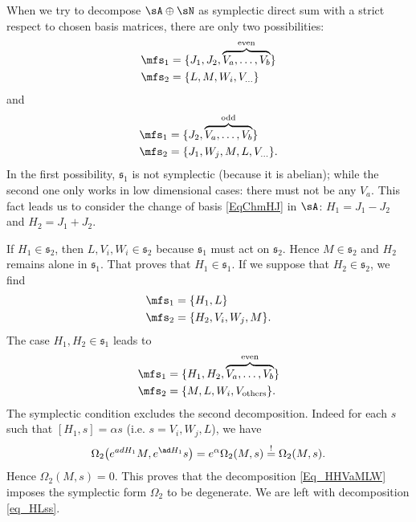 When we try to decompose $\sA\oplus\sN$ as symplectic direct sum with a strict respect to chosen basis matrices, there are only two possibilities:
\begin{equation}
	\begin{split}
		\mfs_1&=\{ J_1,J_2,\overbrace{V_a,\ldots,V_b}^{\text{even}}  \}\\
		\mfs_2&=\{ L,M,W_i,V_{\ldots}  \}
	\end{split}
\end{equation}
and
\begin{equation}
	\begin{split}
		\mfs_1&=\{ J_2,\overbrace{V_a,\ldots,V_b}^{\text{odd}}  \}\\
		\mfs_2&=\{ J_1,W_j,M,L,V_{\ldots}  \}  .
	\end{split}
\end{equation}
In the first possibility, $\mathfrak{s}_{1}$ is not symplectic (because it is abelian); while the second one only works in low dimensional cases: there must not be any $V_a$. This fact leads us to consider  the change of basis \eqref{EqChmHJ} in $\sA$: $H_1=J_1-J_2$ and $H_2=J_1+J_2$.

If $H_1\in\mathfrak{s}_2$, then $L,V_i,W_i\in\mathfrak{s}_2$ because $\mathfrak{s}_1$ must act on $\mathfrak{s}_2$. Hence $M\in\mathfrak{s}_2$ and $H_2$ remains alone in $\mathfrak{s}_1$. That proves that $H_1\in\mathfrak{s}_1$. If we suppose that $H_2\in\mathfrak{s}_2$, we find
\begin{equation}  \label{eq_HLss}
	\begin{split}
		\mfs_1&=\{ H_1,L  \}\\
		\mfs_2&=\{ H_2,V_i,W_j,M  \}.
	\end{split}
\end{equation}
The case $H_1,H_2\in\mathfrak{s}_1$ leads to
\begin{equation}   \label{Eq_HHVaMLW}
	\begin{split}
		\mfs_1&=\{ H_1,H_2,\overbrace{V_a,\ldots, V_b}^{\text{even}}  \}\\
		\mfs_2&=\{ M,L,W_i,V_{\text{others}}  \}.
	\end{split}
\end{equation}
The symplectic condition excludes the second decomposition. Indeed for each $s$ such that $[H_1,s]=\alpha s$ (i.e. $s=V_i,W_j,L$), we have
\[
	\Omega_2\big(  e^{ad H_1}M, e^{\ad H_1}s \big)= e^{\alpha}\Omega_2(M,s)\stackrel{!}{=}\Omega_2(M,s).
\]
Hence $\Omega_2(M,s)=0$. This proves that the decomposition \eqref{Eq_HHVaMLW} imposes the symplectic form $\Omega_2$ to be degenerate. We are left with decomposition \eqref{eq_HLss}.

